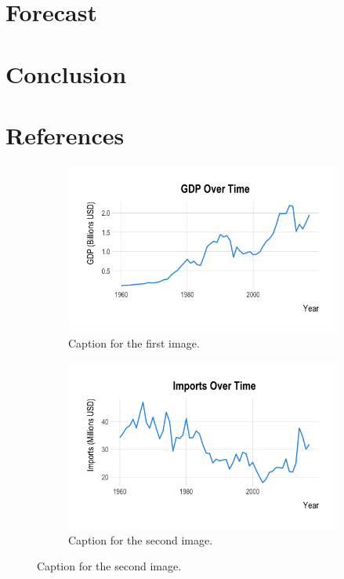 \documentclass[11pt]{article}
\begin{document}
\section{Forecast}

\section{Conclusion}

\newpage

\section{References}

\begin{figure}[htbp]
  \centering
  \begin{subfigure}[b]{0.48\textwidth}
    \centering
    \includegraphics[width=\linewidth]{EDA/GDP_over_Time.png} %
    \caption{Caption for the first image.}
    \label{fig:side:a}
  \end{subfigure}
  \hfill
  \begin{subfigure}[b]{0.48\textwidth}
    \centering
    \includegraphics[width=\linewidth]{EDA/Imports_over_Time.png} %
    \caption{Caption for the second image.}
    \label{fig:side:b}
  \end{subfigure}


\end{figure}
\end{document}

